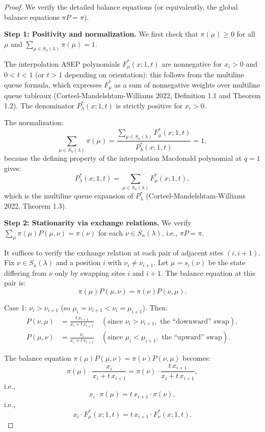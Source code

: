 \documentclass[12pt]{article}
\theoremstyle{definition}
\begin{document}
\begin{proof}
We verify the detailed balance equations (or equivalently, the global balance equations $\pi P = \pi$).

\textbf{Step 1: Positivity and normalization.} We first check that $\pi(\mu) \geq 0$ for all $\mu$ and $\sum_{\mu \in S_n(\lambda)} \pi(\mu) = 1$.

The interpolation ASEP polynomials $F^*_\mu(x;1,t)$ are nonneg\-ative for $x_i > 0$ and $0 < t < 1$ (or $t > 1$ depending on orientation): this follows from the multiline queue formula, which expresses $F^*_\mu$ as a sum of nonneg\-ative weights over multiline queue tableaux (Corteel-Mandelshtam-Williams 2022, Definition 1.1 and Theorem 1.2). The denominator $P^*_\lambda(x;1,t)$ is strictly positive for $x_i > 0$.

The normalization:
$$\sum_{\mu \in S_n(\lambda)} \pi(\mu) = \frac{\sum_{\mu \in S_n(\lambda)} F^*_\mu(x;1,t)}{P^*_\lambda(x;1,t)} = 1,$$
because the defining property of the interpolation Macdonald polynomial at $q=1$ gives:
$$P^*_\lambda(x;1,t) = \sum_{\mu \in S_n(\lambda)} F^*_\mu(x;1,t),$$
which is the multiline queue expansion of $P^*_\lambda$ (Corteel-Mandelshtam-Williams 2022, Theorem 1.3).

\textbf{Step 2: Stationarity via exchange relations.} We verify $\sum_{\mu} \pi(\mu) P(\mu,\nu) = \pi(\nu)$ for each $\nu \in S_n(\lambda)$, i.e., $\pi P = \pi$.

It suffices to verify the exchange relation at each pair of adjacent sites $(i, i+1)$. Fix $\nu \in S_n(\lambda)$ and a position $i$ with $\nu_i \neq \nu_{i+1}$. Let $\mu = s_i(\nu)$ be the state differing from $\nu$ only by swapping sites $i$ and $i+1$. The balance equation at this pair is:
$$\pi(\mu) P(\mu,\nu) = \pi(\nu) P(\nu,\mu).$$

Case 1: $\nu_i > \nu_{i+1}$ (so $\mu_i = \nu_{i+1} < \nu_i = \mu_{i+1}$). Then:
\begin{align*}
P(\nu, \mu) &= \frac{t\, x_{i+1}}{x_i + t\, x_{i+1}} \quad (\text{since }\nu_i > \nu_{i+1}, \text{ the ``downward'' swap}), \\
P(\mu, \nu) &= \frac{x_i}{x_i + t\, x_{i+1}} \quad (\text{since }\mu_i < \mu_{i+1}, \text{ the ``upward'' swap}).
\end{align*}

The balance equation $\pi(\mu)P(\mu,\nu) = \pi(\nu)P(\nu,\mu)$ becomes:
$$\pi(\mu) \cdot \frac{x_i}{x_i + t\,x_{i+1}} = \pi(\nu) \cdot \frac{t\,x_{i+1}}{x_i + t\,x_{i+1}},$$
i.e.,
$$x_i \cdot \pi(\mu) = t\,x_{i+1} \cdot \pi(\nu),$$
i.e.,
$$x_i \cdot F^*_\mu(x;1,t) = t\,x_{i+1} \cdot F^*_\nu(x;1,t).$$


\end{proof}
\end{document}
